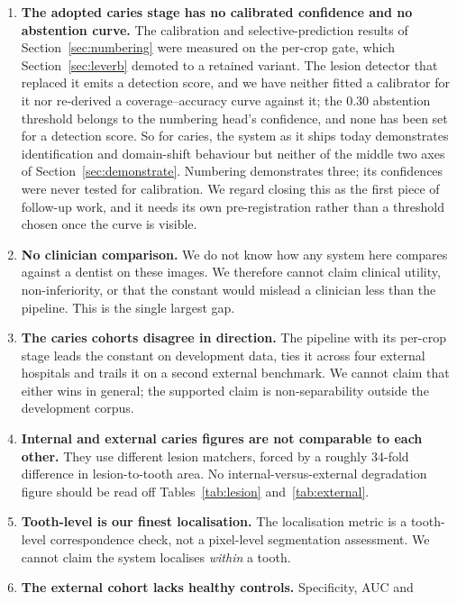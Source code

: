 \documentclass[conference]{IEEEtran}
\begin{document}
\begin{enumerate}
  \item \textbf{The adopted caries stage has no calibrated confidence and no
        abstention curve.} The calibration and selective-prediction results of
        Section~\ref{sec:numbering} were measured on the per-crop gate, which
        Section~\ref{sec:leverb} demoted to a retained variant. The lesion
        detector that replaced it emits a detection score, and we have neither
        fitted a calibrator for it nor re-derived a coverage--accuracy curve
        against it; the 0.30 abstention threshold belongs to the numbering
        head's confidence, and none has been set for a detection score. So
        for caries, the system as it ships today demonstrates identification and
        domain-shift behaviour but neither of the middle two axes of
        Section~\ref{sec:demonstrate}. Numbering demonstrates three; its
        confidences were never tested for calibration. We regard
        closing this as the first piece of follow-up work, and it needs its own
        pre-registration rather than a threshold chosen once the curve is
        visible.
  \item \textbf{No clinician comparison.} We do not know how any system here
        compares against a dentist on these images. We therefore cannot claim
        clinical utility, non-inferiority, or that the constant would mislead a
        clinician less than the pipeline. This is the single largest gap.
  \item \textbf{The caries cohorts disagree in direction.} The pipeline with its
        per-crop stage leads the constant on development data, ties it across
        four external hospitals and trails it on a second external benchmark. We
        cannot claim that either wins in general; the supported claim is
        non-separability outside the development corpus.
  \item \textbf{Internal and external caries figures are not comparable to each
        other.} They use different lesion matchers, forced by a roughly 34-fold
        difference in lesion-to-tooth area. No internal-versus-external
        degradation figure should be read off Tables~\ref{tab:lesion}
        and~\ref{tab:external}.
  \item \textbf{Tooth-level is our finest localisation.} The localisation metric
        is a tooth-level correspondence check, not a pixel-level segmentation
        assessment. We cannot claim the system localises \emph{within} a tooth.
  \item \textbf{The external cohort lacks healthy controls.} Specificity, AUC and

\end{enumerate}
\end{document}
